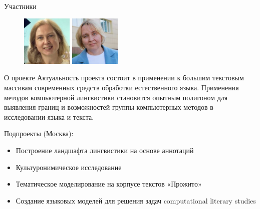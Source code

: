 \documentclass[
  13pt,
  ignorenonframetext,
]{beamer}
\providecommand{\tightlist}{%
  \setlength{\itemsep}{0pt}\setlength{\parskip}{0pt}}\usepackage{longtable,booktabs,array}
\begin{document}
\begin{frame}{Участники}
\begin{figure}
\begin{minipage}{0.50\linewidth}
\includegraphics[width=0.95in,height=\textheight]{images/tsh.jpg}

\end{minipage}%
%
\begin{minipage}{0.50\linewidth}

\includegraphics[width=0.95in,height=\textheight]{images/ak.jpeg}

\end{minipage}%

\end{figure}%
\end{frame}

\begin{frame}{О проекте}
\label{ux43e-ux43fux440ux43eux435ux43aux442ux435-1}
Актуальность проекта состоит в применении к большим текстовым массивам
современных средств обработки естественного языка. Применения методов
компьютерной лингвистики становится опытным полигоном для выявления
границ и возможностей группы компьютерных методов в исследовании языка и
текста.
\end{frame}

\begin{frame}{Подпроекты (Москва):}
\label{ux43fux43eux434ux43fux440ux43eux435ux43aux442ux44b-ux43cux43eux441ux43aux432ux430}
\begin{itemize}
\tightlist
\item
  Построение ландшафта лингвистики на основе аннотаций
\item
  Культуронимическое исследование
\item
  Тематическое моделирование на корпусе текстов «Прожито»
\item
  Создание языковых моделей для решения задач computational literary
  studies
\end{itemize}
\end{frame}
\end{document}
